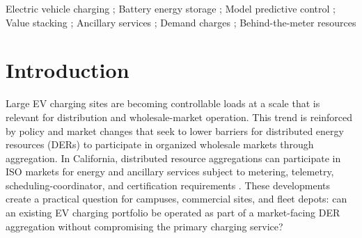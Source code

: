 \documentclass[final,5p,times]{elsarticle}
\providecommand{\sep}{; }
\begin{document}
\begin{frontmatter}
\begin{abstract}
Campus electric-vehicle (EV) charging sites can become substantial behind-the-meter (BTM) distributed-energy-resource portfolios when coordinated with battery energy storage systems (BESS). Their value cannot be inferred from gross wholesale-market revenue: the same dispatch changes retail time-of-use and demand charges, EV user-payment revenue, and service feasibility. This paper develops an execution-aware evaluation framework for a campus EV--BESS portfolio that couples retail bill management with day-ahead (DA), real-time (RT), and ancillary-service (AS) market decisions. The contribution is a physically and financially consistent operating framework, rather than a new MPC or forecasting algorithm. It jointly represents unidirectional workplace EV flexibility, bidirectional BESS dispatch, retail charges, EV service, DA/RT energy settlement, and AS capacity, and evaluates outcomes only from executed dispatch. The RT formulation fixes submitted DA quantities, represents RT quantities as signed increments or decrements, and constrains the actual position as their sum, avoiding an artificial big-M tracking penalty. The framework also clarifies why perfect information over a truncated MPC horizon is not a mathematical upper bound on closed-loop billing-period value. Numerical results in this version are to be regenerated from the corrected formulation before publication.
\end{abstract}

\begin{keyword}
Electric vehicle charging \sep Battery energy storage \sep Model predictive control \sep Value stacking \sep Ancillary services \sep Demand charges \sep Behind-the-meter resources
\end{keyword}

\end{frontmatter}

\section{Introduction}
\label{sec:introduction}

Large EV charging sites are becoming controllable loads at a scale that is relevant for distribution and wholesale-market operation. This trend is reinforced by policy and market changes that seek to lower barriers for distributed energy resources (DERs) to participate in organized wholesale markets through aggregation. In California, distributed resource aggregations can participate in ISO markets for energy and ancillary services subject to metering, telemetry, scheduling-coordinator, and certification requirements \cite{ferc2222}. These developments create a practical question for campuses, commercial sites, and fleet depots: can an existing EV charging portfolio be operated as part of a market-facing DER aggregation without compromising the primary charging service?
\end{document}
